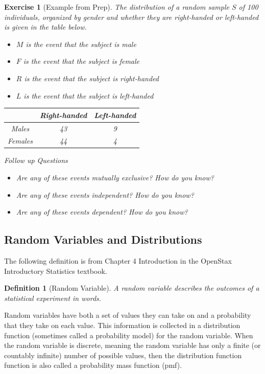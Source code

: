 \documentclass{article}
\theoremstyle{plain}
\theoremstyle{box}
\newtheorem*{definition*}{Definition}
\newtheorem*{exercise*}{Exercise}
\begin{document}
\begin{exercise*}[Example from Prep]
The distribution of a random sample $S$ of 100 individuals, organized by gender and whether they are right-handed or left-handed is given in the table below.
\begin{itemize}
\item $M$ is the event that the subject is male
\item $F$ is the event that the subject is female
\item $R$ is the event that the subject is right-handed
\item $L$ is the event that the subject is left-handed
\end{itemize}

\begin{table}[h]
\begin{center}
\begin{tabular}{|c|c|c|}
\hline
& Right-handed & Left-handed\\
\hline
Males & 43 & 9\\
\hline
Females & 44 & 4\\
\hline
\end{tabular}
\end{center}
\end{table}


Follow up Questions
\begin{itemize}
\item Are any of these events mutually exclusive? How do you know?
\item Are any of these events independent? How do you know?
\item Are any of these events dependent? How do you know?
\end{itemize}
\end{exercise*}


\newpage
\subsection{Random Variables and Distributions}
\noindent The following definition is from Chapter 4 Introduction in the OpenStax Introductory Statistics textbook.
\begin{definition*}[Random Variable]
A random variable describes the outcomes of a statistical experiment in words.
\end{definition*}
Random variables have both a set of values they can take on and a probability that they take on each value. This information is collected in a distribution function (sometimes called a probability model) for the random variable. When the random variable is discrete, meaning the random variable has only a finite (or countably infinite) number of possible values, then the distribution function function is also called a probability mass function (pmf).
\end{document}
